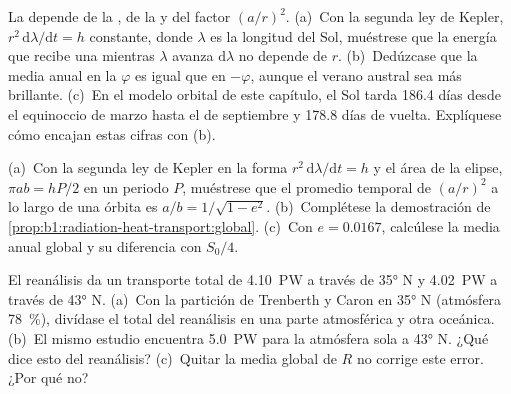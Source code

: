 \begin{exercise}[$\star\star\star$]\label{exo:b1:radiation-heat-transport:10}
La  depende de la , de la  y del factor $(a/r)^2$. (a)~Con la segunda ley de Kepler, $r^2\,\mathrm d\lambda/\mathrm dt = h$
constante, donde $\lambda$ es la longitud  del Sol, muéstrese que la energía que recibe una  mientras $\lambda$ avanza $\mathrm d\lambda$ no depende de
$r$. (b)~Dedúzcase que la  media anual en la  $\varphi$ es igual que en $-\varphi$, aunque el verano austral sea más brillante. (c)~En el modelo orbital de este capítulo, el Sol tarda \num{186.4} días desde el equinoccio de marzo hasta el de septiembre y \num{178.8} días de vuelta. Explíquese cómo encajan estas cifras con (b).
\end{exercise}

\begin{exercise}[$\star\star\star$]\label{exo:b1:radiation-heat-transport:11}
(a)~Con la segunda ley de Kepler en la forma $r^2\,\mathrm d\lambda/\mathrm dt = h$
y el área de la elipse, $\pi a b = hP/2$ en un periodo $P$, muéstrese que el promedio temporal de $(a/r)^2$ a lo largo de una órbita es $a/b = 1/\sqrt{1 - e^2}$. (b)~Complétese la demostración de \cref{prop:b1:radiation-heat-transport:global}. (c)~Con $e = 0.0167$, calcúlese la media anual global y su diferencia con $S_0/4$.
\end{exercise}

\begin{exercise}[$\star\star\star$]\label{exo:b1:radiation-heat-transport:12}
El reanálisis da un transporte total de \qty{4.10}{PW} a través de \ang{35} N y
\qty{4.02}{PW} a través de \ang{43} N. (a)~Con la partición de Trenberth y Caron en \ang{35} N (atmósfera \qty{78}{\percent}), divídase el total del reanálisis en una parte atmosférica y otra oceánica. (b)~El mismo estudio encuentra \qty{5.0}{PW} para la atmósfera sola a \ang{43} N. ¿Qué dice esto del reanálisis? (c)~Quitar la media global de $R$ no corrige este error. ¿Por qué no?
\end{exercise}


